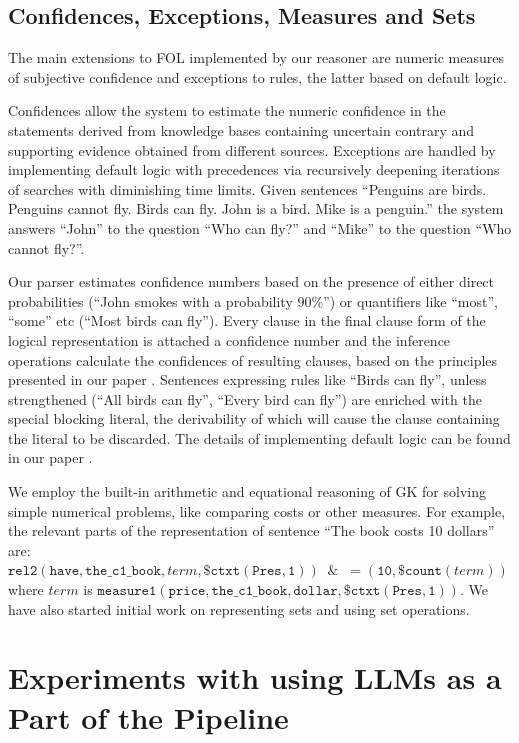 \documentclass[runningheads]{llncs}
\begin{document}
\subsection{Confidences, Exceptions, Measures and Sets}

The main extensions to FOL implemented by our reasoner are numeric measures of subjective confidence and exceptions to rules, 
the latter based on default logic.

Confidences allow the system to estimate the numeric confidence in the statements 
derived from knowledge bases containing uncertain contrary and supporting evidence
obtained from different sources. Exceptions are handled by implementing default logic with precedences via recursively deepening
iterations of searches with diminishing time limits. Given sentences ``Penguins are birds. Penguins cannot fly. Birds can fly. John is a bird. Mike is a penguin.''
the system answers ``John'' to the question ``Who can fly?'' and ``Mike'' to the question ``Who cannot fly?''.

Our parser estimates confidence numbers based on the presence of either direct probabilities (``John smokes with a probability 90\%'') 
or quantifiers like ``most'', ``some'' etc (``Most birds can fly''). Every clause in the final clause form of the logical representation
is attached a confidence number and the inference operations calculate the confidences of resulting clauses, based on the principles 
presented in our paper \cite{ref_confidences}. Sentences expressing rules like ``Birds can fly'', unless strengthened (``All birds can fly'', ``Every bird
can fly'') are enriched with the special blocking literal, the derivability of which will cause the clause containing the literal to be discarded. 
The details of implementing default logic can be found in our paper \cite{ref_exceptions}.

We employ the built-in arithmetic and equational reasoning of GK for solving simple numerical problems, like comparing costs or other measures.
For example, the relevant parts of the representation of sentence ``The book costs 10 dollars'' are:
$\mathtt{rel2(have,the\_c1\_book,\mathit{term},\$ctxt(Pres,1)) \; \; \& \; \; =(10,\$count(\mathit{term}))}$ \\
where $\mathit{term}$ is 
$\mathtt{measure1(price,the\_c1\_book,dollar,\$ctxt(Pres,1))}$.   
We have also started initial work on representing sets and using set operations.


\section{Experiments with using LLMs as a Part of the Pipeline}
\end{document}
